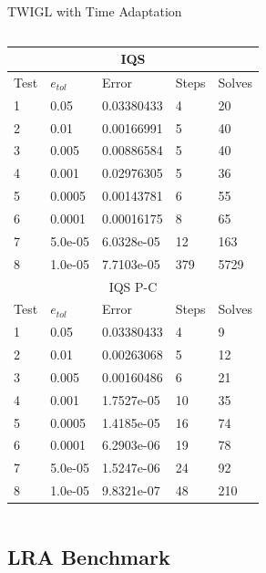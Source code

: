 \documentclass[8pt,xcolor=dvipnames]{beamer}
\begin{document}
\begin{frame}{TWIGL with Time Adaptation}
\begin{columns}
\begin{table}
\begin{center}
{{\begin{tabular}{|l|l|l|l|l|}
\multicolumn{5}{|c|}{IQS} \\
\hline
Test & $e_{tol}$ & Error & Steps & Solves \\
\hline
1 &	0.05 	&	0.03380433 &	4   &	20   \\
2 &	0.01 	&	0.00166991 &	5   &	40  \\
3 &	0.005  	&	0.00886584 &	5   &	40  \\
4 &	0.001 	&	0.02976305 &	5   &	36  \\
5 &	0.0005 	&	0.00143781 &	6   &	55  \\
\hline
\rowcolor{yellow} 6 &	0.0001 	&	0.00016175 &	8   &	65  \\
\hline
7 &	5.0e-05 &	6.0328e-05 &	12  &	163  \\
8 &	1.0e-05 &	7.7103e-05 &	379 &	5729 \\
\hline

\multicolumn{5}{|c|}{IQS P-C} \\
\hline
Test & $e_{tol}$ & Error & Steps & Solves \\
\hline
1 &	0.05    &	0.03380433 &	4  &	9   \\
2 &	0.01    &	0.00263068 &	5  &	12  \\
3 &	0.005   &	0.00160486 &	6  &	21  \\
\hline
\rowcolor{yellow} 4 &	0.001   &	1.7527e-05 &	10 &	35  \\
\hline
5 &	0.0005  &	1.4185e-05 &	16 &	74  \\
6 &	0.0001  &	6.2903e-06 &	19 &	78  \\
7 &	5.0e-05 &	1.5247e-06 &	24 &	92  \\
8 &	1.0e-05  &	9.8321e-07 &	48 &	210 \\
\hline
\end{tabular}}}
\end{center}
\end{table}

\end{columns}

\end{frame}

\subsection{LRA Benchmark}
\end{document}
